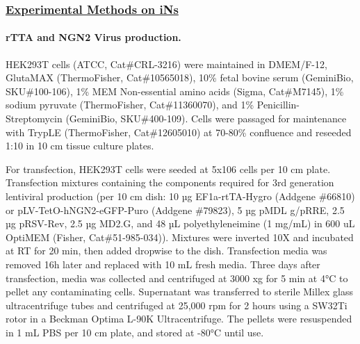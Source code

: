 \subsubsection{\underline{Experimental Methods on iNs}} 

\paragraph{rTTA and NGN2 Virus production.}
HEK293T cells (ATCC, Cat\#CRL-3216) were maintained in DMEM/F-12, GlutaMAX (ThermoFisher, Cat\#10565018), 10\% fetal bovine serum (GeminiBio, SKU\#100-106), 1\% MEM Non-essential amino acids (Sigma, Cat\#M7145), 1\% sodium pyruvate (ThermoFisher, Cat\#11360070), and 1\% Penicillin-Streptomycin (GeminiBio, SKU\#400-109). Cells were passaged for maintenance with TrypLE (ThermoFisher, Cat\#12605010) at 70-80\% confluence and reseeded 1:10 in 10 cm tissue culture plates.

For transfection, HEK293T cells were seeded at 5x106 cells per 10 cm plate. Transfection mixtures containing the components required for 3rd generation lentiviral production (per 10 cm dish: 10 µg EF1a-rtTA-Hygro (Addgene \#66810) or pLV-TetO-hNGN2-eGFP-Puro (Addgene \#79823), 5 µg pMDL g/pRRE, 2.5 µg pRSV-Rev, 2.5 µg MD2.G, and 48 µL polyethyleneimine (1 mg/mL) in 600 uL OptiMEM (Fisher, Cat\#51-985-034)). Mixtures were inverted 10X and incubated at RT for 20 min, then added dropwise to the dish. Transfection media was removed 16h later and replaced with 10 mL fresh media. Three days after transfection, media was collected and centrifuged at 3000 xg for 5 min at 4°C to pellet any contaminating cells. Supernatant was transferred to sterile Millex glass ultracentrifuge tubes and centrifuged at 25,000 rpm for 2 hours using a SW32Ti rotor in a Beckman Optima L-90K Ultracentrifuge. The pellets were resuspended in 1 mL PBS per 10 cm plate, and stored at -80°C until use.

